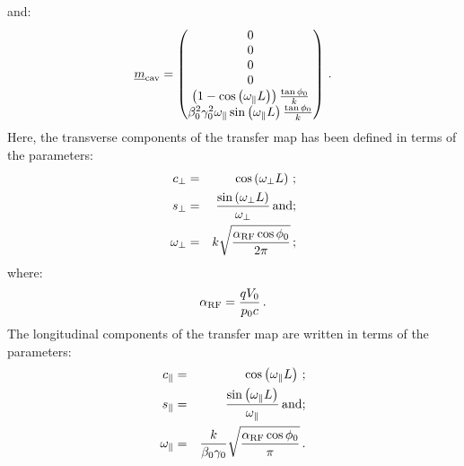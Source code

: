 and:
\begin{equation}
  \underline{m}_{\rm cav} = \begin{pmatrix} 0 \\ 0 \\ 0 \\ 0 \\
                                   \left( 1 - \cos\left( \omega_\parallel L \right) \right) \frac{\tan \phi_0}{k} \\
                                   \beta_0^2 \gamma_0^2 \omega_\parallel \sin\left(\omega_\parallel L \right) \frac{\tan \phi_0}{k} \\
                           \end{pmatrix} \, .
\end{equation}
Here, the transverse components of the transfer map has been defined in
terms of the parameters: 
\begin{eqnarray}
  c_\perp      & = & \cos \left( \omega_\perp L \right) \, ; \label{Eq:TrnsMat:CylCav:cPerp} \\
  s_\perp      & = & \frac{ \sin \left( \omega_\perp L \right)}{\omega_\perp} \, {\rm and};\label{Eq:TrnsMat:CylCav:sPerp}\\
  \omega_\perp & = & k \sqrt{\frac{\alpha_{\rm RF} \cos \phi_0}{2\pi}} \, ; \label{Eq:TrnsMat:CylCav:omegaPerp}
\end{eqnarray}
where:
\begin{equation}
  \alpha_{\rm RF} = \frac{q V_0}{p_0 c} \, . \label{Eq:TrnsMat:CylCav:alphaRF}
\end{equation}
The longitudinal components of the transfer map are written in terms
of the parameters:
\begin{eqnarray}
  c_\parallel      & = & \cos \left( \omega_\parallel L \right) \, ; \label{Eq:TrnsMat:CylCav:cParallel}\\
  s_\parallel      & = & \frac{ \sin \left( \omega_\parallel L \right)}{\omega_\parallel} \, {\rm and};\label{Eq:TrnsMat:CylCav:sParallel}\\
  \omega_\parallel & = & \frac{k}{\beta_0 \gamma_0} \sqrt{\frac{\alpha_{\rm RF} \cos \phi_0}{\pi}} \, . \label{Eq:TrnsMat:CylCav:omegaParallel}
\end{eqnarray}
